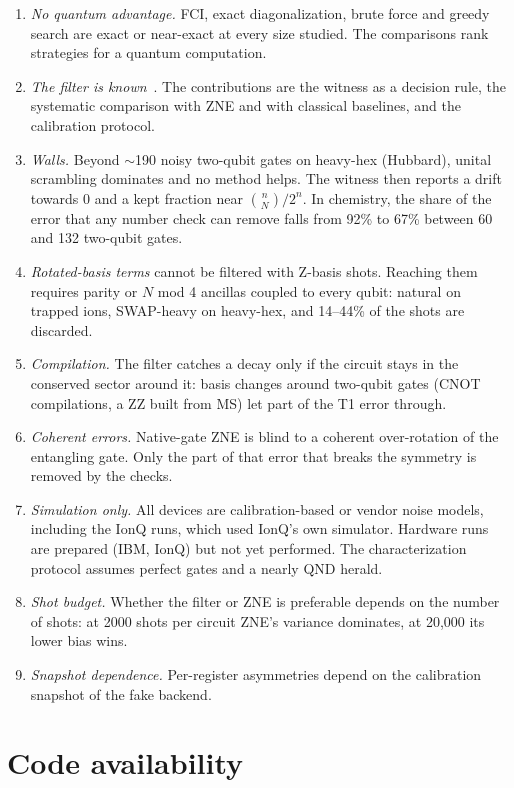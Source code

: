 \documentclass[11pt]{article}
\begin{document}
\begin{enumerate}
\item \emph{No quantum advantage.} FCI, exact diagonalization, brute force and greedy search are
exact or near-exact at every size studied. The comparisons rank strategies for a quantum
computation.
\item \emph{The filter is known}~\cite{bonetmonroig2018,mcardle2019}. The contributions are the
witness as a decision rule, the systematic comparison with ZNE and with classical baselines, and the
calibration protocol.
\item \emph{Walls.} Beyond $\sim$190 noisy two-qubit gates on heavy-hex (Hubbard), unital scrambling
dominates and no method helps. The witness then reports a drift towards 0 and a kept fraction near
$\binom nN/2^n$. In chemistry, the share of the error that any number check can remove falls from
92\% to 67\% between 60 and 132 two-qubit gates.
\item \emph{Rotated-basis terms} cannot be filtered with Z-basis shots. Reaching them requires parity or
$N$ mod 4 ancillas coupled to every qubit: natural on trapped ions, SWAP-heavy on heavy-hex, and 14--44\%
of the shots are discarded.
\item \emph{Compilation.} The filter catches a decay only if the circuit stays in the conserved sector around it: basis changes around two-qubit gates (CNOT compilations, a ZZ built from MS) let part of the T1 error through.
\item \emph{Coherent errors.} Native-gate ZNE is blind to a coherent over-rotation of the entangling gate.
Only the part of that error that breaks the symmetry is removed by the checks.
\item \emph{Simulation only.} All devices are calibration-based or vendor noise models, including
the IonQ runs, which used IonQ's own simulator. Hardware runs are prepared (IBM, IonQ) but not yet
performed. The characterization protocol assumes perfect gates and a nearly QND herald.
\item \emph{Shot budget.} Whether the filter or ZNE is preferable depends on the number of shots: at
2000 shots per circuit ZNE's variance dominates, at 20{,}000 its lower bias wins.
\item \emph{Snapshot dependence.} Per-register asymmetries depend on the calibration snapshot of the
fake backend.
\end{enumerate}

\section{Code availability}
\sloppy
\end{document}
